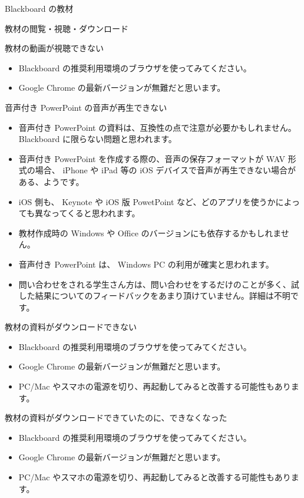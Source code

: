 \documentclass[a4j,10pt]{jsarticle}
\def\lthtmlcheckvsize{\ifdim\ht\sizebox<\vsize 
  \ifdim\wd\sizebox<\hsize\expandafter\hfill\fi \expandafter\vfill
  \else\expandafter\vss\fi}%
\begin{document}
{\newpage\clearpage
{}%
\begin{frame}[label={sec:org4f6cf9d},fragile]{Blackboard の教材}
\begin{block}{教材の閲覧・視聴・ダウンロード}
\begin{block}{教材の動画が視聴できない}
\begin{itemize}
\item Blackboard の推奨利用環境のブラウザを使ってみてください。
\item Google Chrome の最新バージョンが無難だと思います。
\end{itemize}
\end{block}
\par
\begin{block}{音声付き PowerPoint の音声が再生できない}
\begin{itemize}
\item 音声付き PowerPoint の資料は、互換性の点で注意が必要かもしれません。 Blackboard に限らない問題と思われます。
\item 音声付き PowerPoint を作成する際の、音声の保存フォーマットが WAV 形式の場合、 iPhone や iPad 等の iOS デバイスで音声が再生できない場合がある、ようです。
\item iOS 側も、 Keynote や iOS 版 PowetPoint など、どのアプリを使うかによっても異なってくると思われます。
\item 教材作成時の Windows や Office のバージョンにも依存するかもしれません。
\item 音声付き PowerPoint は、 Windows PC の利用が確実と思われます。
\item 問い合わせをされる学生さん方は、問い合わせをするだけのことが多く、試した結果についてのフィードバックをあまり頂けていません。詳細は不明です。
\end{itemize}
\end{block}
\par
\begin{block}{教材の資料がダウンロードできない}
\begin{itemize}
\item Blackboard の推奨利用環境のブラウザを使ってみてください。
\item Google Chrome の最新バージョンが無難だと思います。
\item PC/Mac やスマホの電源を切り、再起動してみると改善する可能性もあります。
\end{itemize}
\end{block}
\par
\begin{block}{教材の資料がダウンロードできていたのに、できなくなった}
\begin{itemize}
\item Blackboard の推奨利用環境のブラウザを使ってみてください。
\item Google Chrome の最新バージョンが無難だと思います。
\item PC/Mac やスマホの電源を切り、再起動してみると改善する可能性もあります。
\end{itemize}
\end{block}
\end{block}
\end{frame}%
\lthtmlfigureZ
\lthtmlcheckvsize\clearpage}
\end{document}
